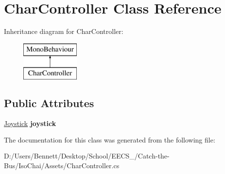 \hypertarget{class_char_controller}{}\section{Char\+Controller Class Reference}
\label{class_char_controller}
Inheritance diagram for Char\+Controller\+:\begin{figure}[H]
\begin{center}
\leavevmode
\includegraphics[height=2.000000cm]{class_char_controller}
\end{center}
\end{figure}
\subsection*{Public Attributes}
\begin{DoxyCompactItemize}
\item 
\mbox{\label{class_char_controller_a61830f88f881dd25a5d4e399c08b3207}} 
\mbox{\hyperlink{class_joystick}{Joystick}} {\bfseries joystick}
\end{DoxyCompactItemize}


The documentation for this class was generated from the following file\+:\begin{DoxyCompactItemize}
\item 
D\+:/\+Users/\+Bennett/\+Desktop/\+School/\+E\+E\+C\+S\+\_/\+Catch-\/the-\/\+Bus/\+Iso\+Chai/\+Assets/Char\+Controller.\+cs\end{DoxyCompactItemize}
